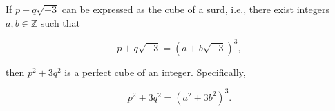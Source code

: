 If $p + q\sqrt{-3}$ can be expressed as the cube of a surd, i.e., there exist integers $a, b \in \mathbb{Z}$ such that

$$
p + q\sqrt{-3} = (a + b\sqrt{-3})^3,
$$

then $p^2 + 3q^2$ is a perfect cube of an integer. Specifically,

$$
p^2 + 3q^2 = (a^2 + 3b^2)^3.
$$
